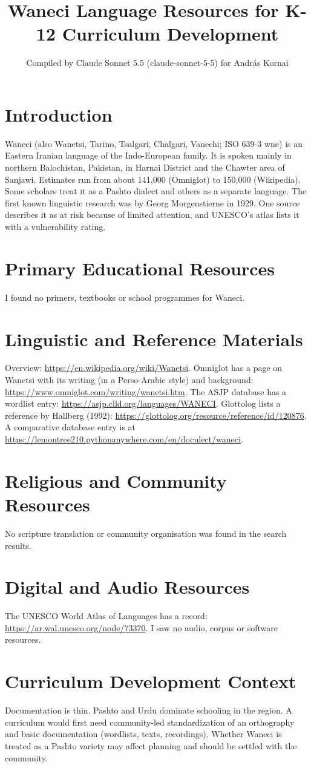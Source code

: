 \documentclass[12pt]{article}
\title{Waneci Language Resources for K-12 Curriculum Development}
\author{Compiled by Claude Sonnet 5.5 (claude-sonnet-5-5) for Andr\'as Kornai}
\date{}
\begin{document}
\maketitle

\section{Introduction}
Waneci (also Wanetsi, Tarino, Tsalgari, Chalgari, Vanechi; ISO 639-3 wne) is an Eastern Iranian language of the Indo-European family. It is spoken mainly in northern Balochistan, Pakistan, in Harnai District and the Chawter area of Sanjawi. Estimates run from about 141,000 (Omniglot) to 150,000 (Wikipedia). Some scholars treat it as a Pashto dialect and others as a separate language. The first known linguistic research was by Georg Morgenstierne in 1929. One source describes it as at risk because of limited attention, and UNESCO's atlas lists it with a vulnerability rating.

\section{Primary Educational Resources}
I found no primers, textbooks or school programmes for Waneci.

\section{Linguistic and Reference Materials}
Overview: \url{https://en.wikipedia.org/wiki/Wanetsi}. Omniglot has a page on Wanetsi with its writing (in a Perso-Arabic style) and background: \url{https://www.omniglot.com/writing/wanetsi.htm}. The ASJP database has a wordlist entry: \url{https://asjp.clld.org/languages/WANECI}. Glottolog lists a reference by Hallberg (1992): \url{https://glottolog.org/resource/reference/id/120876}. A comparative database entry is at \url{https://lemontree210.pythonanywhere.com/en/doculect/waneci}.

\section{Religious and Community Resources}
No scripture translation or community organisation was found in the search results.

\section{Digital and Audio Resources}
The UNESCO World Atlas of Languages has a record: \url{https://ar.wal.unesco.org/node/73370}. I saw no audio, corpus or software resources.

\section{Curriculum Development Context}
Documentation is thin. Pashto and Urdu dominate schooling in the region. A curriculum would first need community-led standardization of an orthography and basic documentation (wordlists, texts, recordings). Whether Waneci is treated as a Pashto variety may affect planning and should be settled with the community.
\end{document}

